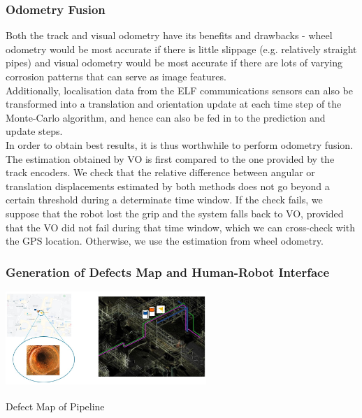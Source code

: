 \documentclass[11pt]{article}		%
\newcommand{\supercite}[1]{\textsuperscript{\cite{#1}}}		%
\begin{document}
	\subsubsection{Odometry Fusion} \label{odometryFusion}
	Both the track and visual odometry have its benefits and drawbacks - wheel odometry would be most accurate if there is little slippage (e.g. relatively straight pipes) and visual odometry would be most accurate if there are lots of varying corrosion patterns that can serve as image features. 
	\\ \hspace*{3ex}Additionally, localisation data from the ELF communications sensors can also be transformed into a translation and orientation update at each time step of the Monte-Carlo algorithm, and hence can also be fed in to the prediction and update steps.
	\\ \hspace*{3ex}In order to obtain best results, it is thus worthwhile to perform odometry fusion. The estimation obtained by VO is first compared to the one provided by the track encoders. We check that the relative difference between angular or translation displacements estimated by both methods does not go beyond a certain threshold during a determinate time window. If the check fails, we suppose that the robot lost the grip and the system falls back to VO, provided that the VO did not fail during that time window, which we can cross-check with the GPS location. Otherwise, we use the estimation from wheel odometry.
	
	\subsubsection{Generation of Defects Map and Human-Robot Interface}
	
			\begin{floatingfigure}[r]{0.6\textwidth}
				\centering
				\includegraphics[width=0.57\textwidth]{mapping.jpg}
				\caption{Defect Map of Pipeline\supercite{ELFTransmitter}}
				\label{defectMap}
			\end{floatingfigure}
	
\end{document}
